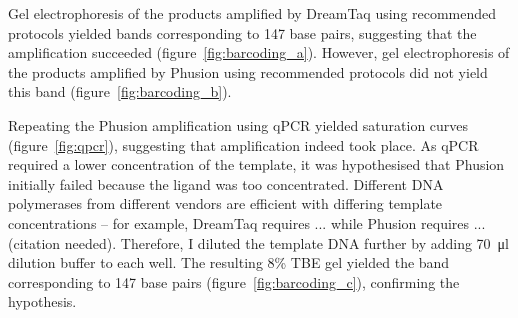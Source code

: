 \documentclass[parskip=full, numbers=noenddot]{scrreprt}
\begin{document}
Gel electrophoresis of the products amplified by DreamTaq using recommended protocols yielded bands corresponding to 147 base pairs, suggesting that the amplification succeeded (figure~\ref{fig:barcoding_a}). However, gel electrophoresis of the products amplified by Phusion using recommended protocols did not yield this band (figure~\ref{fig:barcoding_b}).

Repeating the Phusion amplification using qPCR yielded saturation curves (figure~\ref{fig:qpcr}), suggesting that amplification indeed took place. As qPCR required a lower concentration of the template, it was hypothesised that Phusion initially failed because the ligand was too concentrated. Different DNA polymerases from different vendors are efficient with differing template concentrations – for example, DreamTaq requires ... while Phusion requires ... (citation needed). Therefore, I diluted the template DNA further by adding \SI{70}{\micro\litre} dilution buffer to each well. The resulting 8\% TBE gel yielded the band corresponding to 147 base pairs (figure~\ref{fig:barcoding_c}), confirming the hypothesis.
\end{document}
